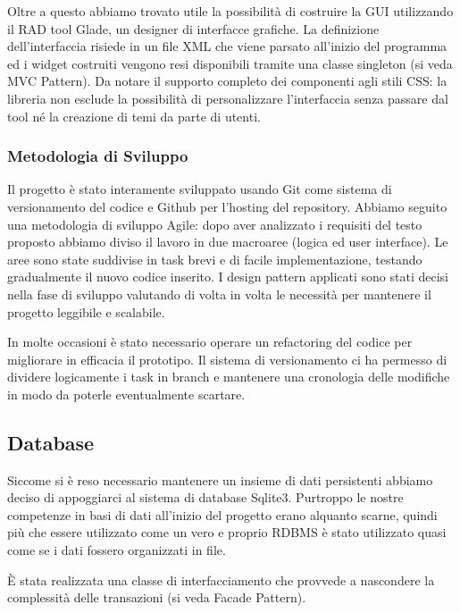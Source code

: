 \documentclass[a4paper, 11pt]{article}
\begin{document}
Oltre a questo abbiamo trovato utile la possibilità di costruire la GUI utilizzando il RAD tool Glade, un designer di interfacce grafiche.
La definizione dell'interfaccia risiede in un file XML che viene parsato all'inizio del programma ed i widget costruiti vengono resi disponibili tramite una classe singleton (si veda MVC Pattern). 
Da notare il supporto completo dei componenti agli stili CSS: la libreria non esclude la possibilità di personalizzare l'interfaccia senza passare dal tool né la creazione di temi da parte di utenti.

\subsubsection{Metodologia di Sviluppo}
Il progetto è stato interamente sviluppato usando Git come sistema di versionamento del codice e Github per l'hosting del repository.
Abbiamo seguito una metodologia di sviluppo Agile: dopo aver analizzato i requisiti del testo proposto abbiamo diviso il lavoro in due macroaree (logica ed user interface).
Le aree sono state suddivise in task brevi e di facile implementazione, testando gradualmente il nuovo codice inserito. I design pattern applicati sono stati decisi nella fase di sviluppo valutando di volta in volta le necessità per mantenere il progetto leggibile e scalabile. 

In molte occasioni è stato necessario operare un refactoring del codice per migliorare in efficacia il prototipo. Il sistema di versionamento ci ha permesso di dividere logicamente i task in branch e mantenere una cronologia delle modifiche in modo da poterle eventualmente scartare.

\subsection{Database}
Siccome si è reso necessario mantenere un insieme di dati persistenti abbiamo deciso di appoggiarci al sistema di database Sqlite3. Purtroppo le nostre competenze in basi di dati all'inizio del progetto erano alquanto scarne, quindi più che essere utilizzato come un vero e proprio RDBMS è stato utilizzato quasi come se i dati fossero organizzati in file.

È stata realizzata una classe di interfacciamento che provvede a nascondere la complessità delle transazioni (si veda Facade Pattern).
\end{document}
